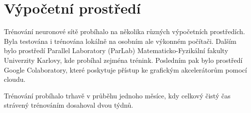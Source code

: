 \section{Výpočetní prostředí}

Trénování neuronové sítě probíhalo na několika různých výpočetních prostředích. Byla testována i trénována lokálně na osobním ale výkonném
počítači. Dalším bylo prostředí Parallel Laboratory (ParLab) Matematicko-Fyzikální fakulty Univerzity Karlovy, kde probíhal zejména trénink.
Posledním pak bylo prostředí Google Colaboratory, které poskytuje přístup ke grafickým akcelerátorům pomocí cloudu.

Trénování probíhalo trhavě v průběhu jednoho měsíce, kdy celkový čistý čas strávený trénováním dosahoval dvou týdnů.